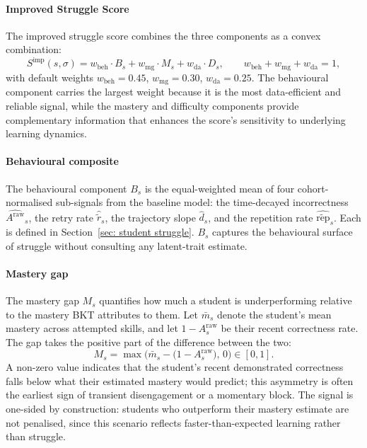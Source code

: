\paragraph{Improved Struggle Score}
The improved struggle score combines the three components as a convex combination:
\begin{equation}
    S^{\mathrm{imp}}(s,\sigma)
    = w_{\mathrm{beh}} \cdot B_s
    + w_{\mathrm{mg}} \cdot M_s
    + w_{\mathrm{da}} \cdot D_s,
    \qquad
    w_{\mathrm{beh}} + w_{\mathrm{mg}} + w_{\mathrm{da}} = 1,
    \label{eq:improved-struggle}
\end{equation}
with default weights $w_{\mathrm{beh}} = 0.45$, $w_{\mathrm{mg}} = 0.30$, $w_{\mathrm{da}} = 0.25$.
The behavioural component carries the largest weight because it is the most data-efficient and reliable signal, while the mastery and difficulty components provide complementary information that enhances the score's sensitivity to underlying learning dynamics.

\paragraph{Behavioural composite}
The behavioural component $B_s$ is the equal-weighted mean of four cohort-normalised sub-signals from the baseline model: the time-decayed incorrectness $\widehat{A^{\mathrm{raw}}}_s$, the retry rate $\hat{\tilde{r}}_s$, the trajectory slope $\hat{d}_s$, and the repetition rate $\widehat{\tilde{\mathrm{rep}}}_s$.
Each is defined in Section~\ref{sec: student struggle}. $B_s$ captures the behavioural surface of struggle without consulting any latent-trait estimate.

\paragraph{Mastery gap}
The mastery gap $M_s$ quantifies how much a student is underperforming relative to the mastery BKT attributes to them. 
Let $\bar{m}_s$ denote the student's mean mastery across attempted skills, and let $1 - A^{\mathrm{raw}}_s$ be their recent correctness rate. 
The gap takes the positive part of the difference between the two:
\begin{equation*}
    M_s = \max\!\Big(\bar{m}_s - \big(1 - A^{\mathrm{raw}}_s\big),\, 0\Big) \in [0, 1].
\end{equation*}
A non-zero value indicates that the student's recent demonstrated correctness falls below what their estimated mastery would predict; this asymmetry is often the earliest sign of transient disengagement or a momentary block.
The signal is one-sided by construction: students who outperform their mastery estimate are not penalised, since this scenario reflects faster-than-expected learning rather than struggle.

